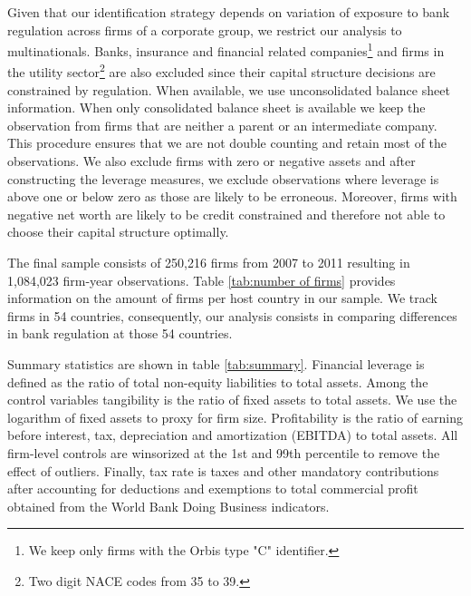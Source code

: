 \documentclass[12pt]{article}
\begin{document}
	Given that our identification strategy depends on variation of exposure to bank regulation across firms of a corporate group, we restrict our analysis to multinationals. Banks, insurance and financial related companies\footnote{We keep only firms with the Orbis type "C" identifier.} and firms in the utility sector\footnote{Two digit NACE codes from 35 to 39.} are also excluded since their capital structure decisions are constrained by regulation. When available, we use unconsolidated balance sheet information. When only consolidated balance sheet is available we keep the observation from firms that are neither a parent or an intermediate company. This procedure ensures that we are not double counting and retain most of the observations. We also exclude firms with zero or negative assets and after constructing the leverage measures, we exclude observations where leverage is above one or below zero as those are likely to be erroneous. Moreover, firms with negative net worth are likely to be credit constrained and therefore not able to choose their capital structure optimally. 
	
	The final sample consists of 250,216 firms from 2007 to 2011 resulting in 1,084,023 firm-year observations. Table \ref{tab:number of firms} provides information on the amount of firms per host country in our sample. We track firms in 54 countries, consequently, our analysis consists in comparing differences in bank regulation at those 54 countries. 
	
	Summary statistics are shown in table \ref{tab:summary}. Financial leverage is defined as the ratio of total non-equity liabilities to total assets. Among the control variables tangibility is the ratio of fixed assets to total assets. We use the logarithm of fixed assets to proxy for firm size. Profitability is the ratio of earning before interest, tax, depreciation and amortization (EBITDA) to total assets. All firm-level controls are winsorized at the 1st and 99th percentile to remove the effect of outliers. Finally, tax rate is taxes and other mandatory contributions after accounting for deductions and exemptions to total commercial profit obtained from the World Bank Doing Business indicators. 
	
\end{document}
